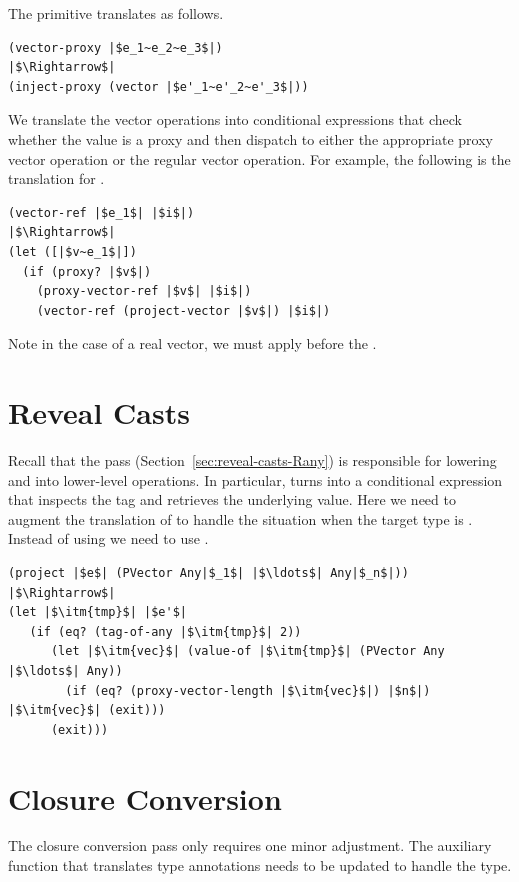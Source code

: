 \documentclass[11pt]{book}
\begin{document}
The  primitive translates as follows.
\begin{lstlisting}
(vector-proxy |$e_1~e_2~e_3$|)
|$\Rightarrow$|
(inject-proxy (vector |$e'_1~e'_2~e'_3$|))
\end{lstlisting}

We translate the vector operations into conditional expressions that
check whether the value is a proxy and then dispatch to either the
appropriate proxy vector operation or the regular vector operation.
For example, the following is the translation for .
\begin{lstlisting}
(vector-ref |$e_1$| |$i$|)
|$\Rightarrow$|
(let ([|$v~e_1$|])
  (if (proxy? |$v$|)
    (proxy-vector-ref |$v$| |$i$|)
    (vector-ref (project-vector |$v$|) |$i$|)
\end{lstlisting}
Note in the case of a real vector, we must apply 
before the .

\section{Reveal Casts}
\label{sec:reveal-casts-gradual}

Recall that the  pass
(Section~\ref{sec:reveal-casts-Rany}) is responsible for lowering
 and  into lower-level operations.  In
particular,  turns into a conditional expression that
inspects the tag and retrieves the underlying value.  Here we need to
augment the translation of  to handle the situation when
the target type is .  Instead of using
 we need to use .
\begin{lstlisting}
(project |$e$| (PVector Any|$_1$| |$\ldots$| Any|$_n$|))
|$\Rightarrow$|
(let |$\itm{tmp}$| |$e'$|
   (if (eq? (tag-of-any |$\itm{tmp}$| 2))
      (let |$\itm{vec}$| (value-of |$\itm{tmp}$| (PVector Any |$\ldots$| Any))
        (if (eq? (proxy-vector-length |$\itm{vec}$|) |$n$|) |$\itm{vec}$| (exit)))
      (exit)))
\end{lstlisting}


\section{Closure Conversion}
\label{sec:closure-conversion-gradual}

The closure conversion pass only requires one minor adjustment.  The
auxiliary function that translates type annotations needs to be
updated to handle the  type.
\end{document}

